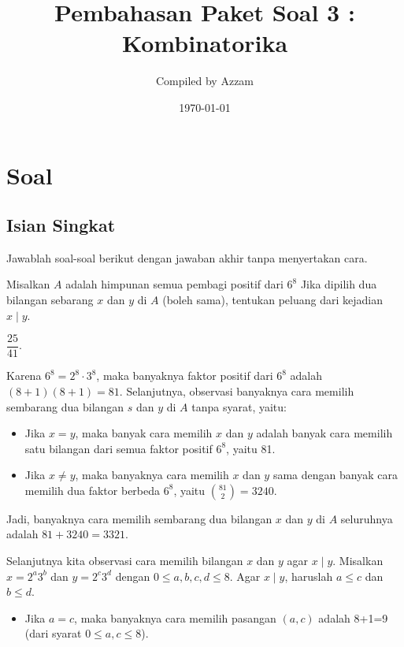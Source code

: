 \documentclass[11pt]{scrartcl}
\begin{document}
	\title{Pembahasan Paket Soal 3 : Kombinatorika} %
	\date{\today}
	\author{Compiled by Azzam}
	\maketitle
	\newpage
	
	\section{Soal}
\subsection{Isian Singkat}
Jawablah soal-soal berikut dengan jawaban akhir tanpa menyertakan cara.

	\begin{soalbaru}
		Misalkan $A$ adalah himpunan semua pembagi positif dari $6^8$ Jika dipilih dua bilangan sebarang $x$ dan $y$ di $A$ (boleh sama), tentukan peluang dari kejadian $x \mid y$. 
		
		\begin{jawaban}
			$\dfrac{25}{41}$.
		\end{jawaban}
		\begin{solusi}
		Karena $6^8 = 2^8 \cdot 3^8$, maka banyaknya faktor positif dari $6^8$ adalah $(8+1)(8+1)=81$. Selanjutnya, observasi banyaknya cara memilih sembarang dua bilangan $s$ dan $y$ di $A$ tanpa syarat, yaitu:
		\begin{itemize}
		\item Jika $x=y$, maka banyak cara memilih $x$ dan $y$ adalah banyak cara memilih satu bilangan dari semua faktor positif $6^8$, yaitu 81.
		
		\item Jika $x\neq y$, maka banyaknya cara memilih $x$ dan $y$ sama dengan banyak cara memilih dua faktor berbeda $6^8$, yaitu $81 \choose 2$$= 3240$.
		\end{itemize}
		
		Jadi, banyaknya cara memilih sembarang dua bilangan $x$ dan $y$ di $A$ seluruhnya adalah $81+3240=3321$.
		
		Selanjutnya kita observasi cara memilih bilangan $x$ dan $y$ agar $x \mid y$. Misalkan $x=2^a3^b$ dan $y=2^c3^d$ dengan $0 \le a,b,c,d \le 8$. Agar $x \mid y$, haruslah $a \le c$ dan $b \le d$.
		\begin{itemize}
		\item Jika $a=c$, maka banyaknya cara memilih pasangan $(a,c)$ adalah 8+1=9 (dari syarat $0 \le a,c \le 8$).
		

\end{itemize}
\end{solusi}
\end{soalbaru}
\end{document}

